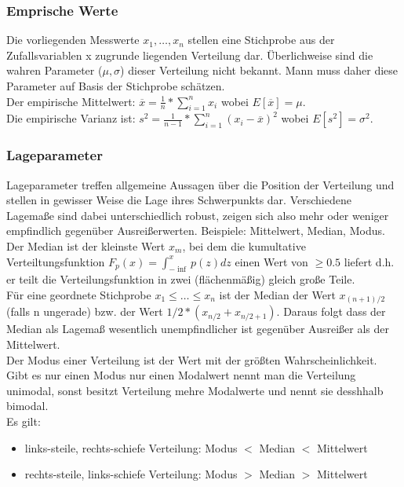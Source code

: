 \documentclass{article} %
\begin{document}
		\subsubsection{Emprische Werte}
		Die vorliegenden Messwerte $x_1,\dots,x_n$ stellen eine Stichprobe aus der Zufallsvariablen x zugrunde liegenden Verteilung dar. Überlichweise sind die wahren Parameter ($\mu,\sigma$) dieser Verteilung nicht bekannt. Mann muss daher diese Parameter auf Basis der Stichprobe schätzen.\\
		Der empirische Mittelwert: $\overline{x} = \frac{1}{n}*\sum_{i=1}^{n} x_i$ wobei $E[\overline{x}] = \mu$.\\
		Die empirische Varianz ist: $s^2 = \frac{1}{n-1}*\sum_{i=1}^{n}(x_i-\overline{x})^2$ wobei $E[s^2] = \sigma^2$.
		\subsubsection{Lageparameter}
		Lageparameter treffen allgemeine Aussagen über die Position der Verteilung und stellen in gewisser Weise die Lage ihres Schwerpunkts dar. Verschiedene Lagemaße sind dabei unterschiedlich robust, zeigen sich also mehr oder weniger empfindlich gegenüber Ausreißerwerten. Beispiele: Mittelwert, Median, Modus.\\
		Der Median ist der kleinste Wert $x_m$, bei dem die kumultative Verteiltungsfunktion $F_p(x) = \int_{-\inf}^{x} p(z) dz$ einen Wert von $\geq 0.5$ liefert d.h. er teilt die Verteilungsfunktion in zwei (flächenmäßig) gleich große Teile.\\
		Für eine geordnete Stichprobe $x_1\leq\dots\leq x_n$ ist der Median der Wert $x_{(n+1)/2}$ (falls n ungerade) bzw. der Wert $1/2*(x_{n/2}+x_{n/2+1})$. Daraus folgt dass der Median als Lagemaß wesentlich unempfindlicher ist gegenüber Ausreißer als der Mittelwert.\\
		Der Modus einer Verteilung ist der Wert mit der größten Wahrscheinlichkeit. Gibt es nur einen Modus nur einen Modalwert nennt man die Verteilung unimodal, sonst besitzt Verteilung  mehre  Modalwerte und nennt sie desshhalb bimodal.\\
		Es gilt:
		\begin{itemize}
			\item links-steile, rechts-schiefe Verteilung: Modus $<$ Median $<$ Mittelwert
			\item rechts-steile, links-schiefe Verteilung: Modus $>$ Median $>$ Mittelwert
		\end{itemize}
\end{document}
